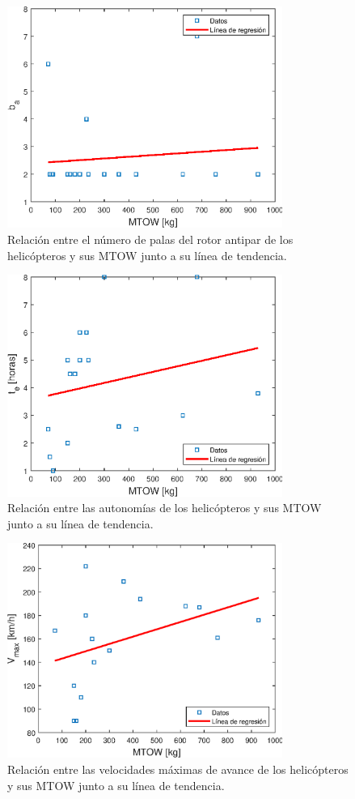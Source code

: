 \begin{figure}
	\centering
	\includegraphics[width=90mm]{graficos/analbtr}
	\caption{Relación entre el número de palas del rotor antipar de los helicópteros y sus MTOW junto a su línea de tendencia.}
	\label{baAS}
\end{figure}
\begin{figure}
	\centering
	\includegraphics[width=90mm]{graficos/analaut}
	\caption{Relación entre las autonomías de los helicópteros y sus MTOW junto a su línea de tendencia.}
	\label{autAS}
\end{figure}
\begin{figure}
	\centering
	\includegraphics[width=90mm]{graficos/analv}
	\caption{Relación entre las velocidades máximas de avance de los helicópteros y sus MTOW junto a su línea de tendencia.}
	\label{vAS}
\end{figure}

